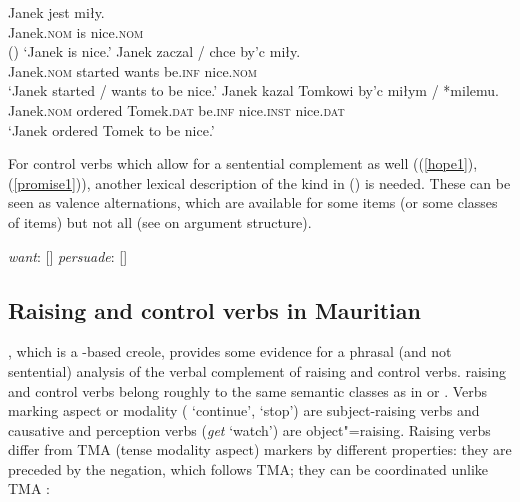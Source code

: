 \begin{exe}
\ex \begin{xlist}
\ex 
\gll Janek jest miły.\\
     Janek.\textsc{nom} is nice.\textsc{nom} \\ \hfill()
\glt `Janek is nice.'
\ex 
\gll Janek              zaczal  /  chce  by'c            miły.\\
     Janek.\textsc{nom} started {} wants be.\textsc{inf} nice.\textsc{nom} \\ 
\glt `Janek started / wants to be nice.'
\ex 
\gll Janek              kazal   Tomkowi            by'c            miłym              / *milemu.\\
     Janek.\textsc{nom} ordered Tomek.\textsc{dat} be.\textsc{inf} nice.\textsc{inst} {} \hphantom{*}nice.\textsc{dat} \\ 
\glt `Janek ordered Tomek to be nice.'
	\end{xlist}
\end{exe}


For control verbs which allow for a sentential complement as well ((\ref{hope1}), (\ref{promise1})),
another lexical description of the kind in () is needed. These can be seen as valence alternations, which are
available for some items (or some classes of items) but not all (see  on argument structure).

\eal
\ex \emph{want}: [\argst {}]
\ex \emph{persuade}: [\argst {}]
\zl




\subsection{Raising and control verbs in Mauritian}\label{sec-maurit}

%
, which is a -based creole, provides some evidence for a phrasal (and not sentential) analysis of the verbal complement of raising and control verbs.
 raising and control verbs belong
roughly to the same semantic classes as in  or . Verbs marking aspect or
modality ( `continue',  `stop') are subject-raising verbs and causative and
perception verbs (\emph{get} `watch') are object"=raising. Raising verbs differ from TMA (tense
modality aspect) markers by different properties: they are preceded by the negation, which follows
TMA; they can be coordinated unlike TMA \citep[]{HenriandLaurens2011}:

